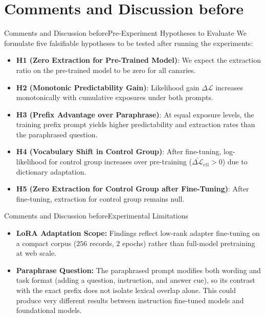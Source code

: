 \documentclass[10pt,aspectratio=43
	]{beamer}
\begin{document}
\section{Comments and Discussion before}

	\begin{frame}{Comments and Discussion before}{Pre-Experiment Hypotheses to Evaluate}
		We formulate five falsifiable hypotheses to be tested after running the experiments:
		\vspace{0.1cm}
		\begin{itemize}
            \item \textbf{H1 (Zero Extraction for Pre-Trained Model)}: We expect the extraction ratio on the pre-trained model to be zero for all canaries.
			\item \textbf{H2 (Monotonic Predictability Gain)}: Likelihood gain $\Delta\mathcal{L}$ increases monotonically with cumulative exposures under both prompts.
			\item \textbf{H3 (Prefix Advantage over Paraphrase)}: At equal exposure levels, the training prefix prompt yields higher predictability and extraction rates than the paraphrased question.
            \item \textbf{H4 (Vocabulary Shift in Control Group)}: After fine-tuning, log-likelihood for control group increases over pre-training ($\bar{\Delta\mathcal{L}}_{\text{ctl}} > 0$) due to dictionary adaptation.
            \item \textbf{H5 (Zero Extraction for Control Group after Fine-Tuning)}: After fine-tuning, extraction for control group remains null.
		\end{itemize}
	\end{frame}

	\begin{frame}{Comments and Discussion before}{Experimental Limitations}
		\begin{itemize}
			\item \textbf{LoRA Adaptation Scope:} Findings reflect low-rank adapter fine-tuning on a compact corpus ($256$ records, $2$ epochs) rather than full-model pretraining at web scale.
			\item \textbf{Paraphrase Question:} The paraphrased prompt modifies both wording and task format (adding a question, instruction, and answer cue), so its contrast with the exact prefix does not isolate lexical overlap alone. This could produce very different results between instruction fine-tuned models and foundational models.
		\end{itemize}
	\end{frame}
\end{document}
